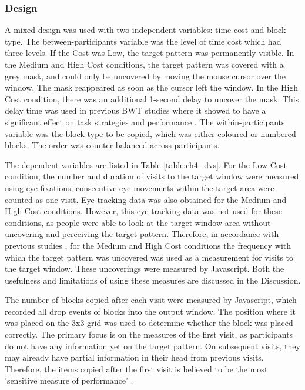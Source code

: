 \subsubsection{Design}
A mixed design was used with two independent variables: time cost and block type. The between-participants variable was the level of time cost which had three levels. If the Cost was Low, the target pattern was permanently visible. In the Medium and High Cost conditions, the target pattern was covered with a grey mask, and could only be uncovered by moving the mouse cursor over the window. The mask reappeared as soon as the cursor left the window. In the High Cost condition, there was an additional 1-second delay to uncover the mask. This delay time was used in previous BWT studies where it showed to have a significant effect on task strategies and performance \citep{Gray2006, Morgan2009, Waldron2007}. The within-participants variable was the block type to be copied, which was either coloured or numbered blocks. The order was counter-balanced across participants.

The dependent variables are listed in Table \ref{table:ch4_dvs}. For the Low Cost condition, the number and duration of visits to the target window were measured using eye fixations; consecutive eye movements within the target area were counted as one visit. Eye-tracking data was also obtained for the Medium and High Cost conditions. However, this eye-tracking data was not used for these conditions, as people were able to look at the target window area without uncovering and perceiving the target pattern. Therefore, in accordance with previous studies \citep{Morgan2009, Patrick2014, Waldron2007, Waldron2011}, for the Medium and High Cost conditions the frequency with which the target pattern was uncovered was used as a measurement for visits to the target window. These uncoverings were measured by Javascript. Both the usefulness and limitations of using these measures are discussed in the Discussion.
 
The number of blocks copied after each visit were measured by Javascript, which recorded all drop events of blocks into the output window. The position where it was placed on the 3x3 grid was used to determine whether the block was placed correctly.
The primary focus is on the measures of the first visit, as participants do not have any information yet on the target pattern. On subsequent visits, they may already have partial information in their head from previous visits. Therefore, the items copied after the first visit is believed to be the most 'sensitive measure of performance' \citep{Janssen2012}. 

